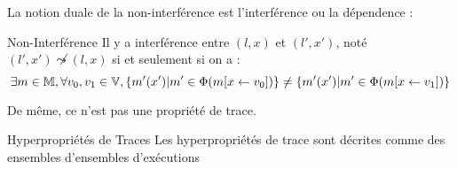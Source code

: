 \documentclass{cours}
\begin{document}
La notion duale de la non-interférence est l'interférence ou la dépendence : 
\begin{définition}{Non-Interférence}{}
    Il y a interférence entre $(l, x)$ et $(l', x')$, noté $(l',x') \not\leadsto (l, x)$ si et seulement si on a : 
    \[
        \exists m \in \mathbb{M}, \forall v_{0}, v_{1} \in \mathbb{V}, \left\{m'(x')\middle| m' \in \Phi(m[x \gets v_{0}])\right\} \neq \left\{m'(x')\middle| m'\in \Phi(m[x \gets v_{1}])\right\}
    \]
\end{définition}
De même, ce n'est pas une propriété de trace.

\begin{définition}{Hyperpropriétés de Traces}{}
    Les hyperpropriétés de trace sont décrites comme des ensembles d'ensembles d'exécutions
\end{définition}
\end{document}
